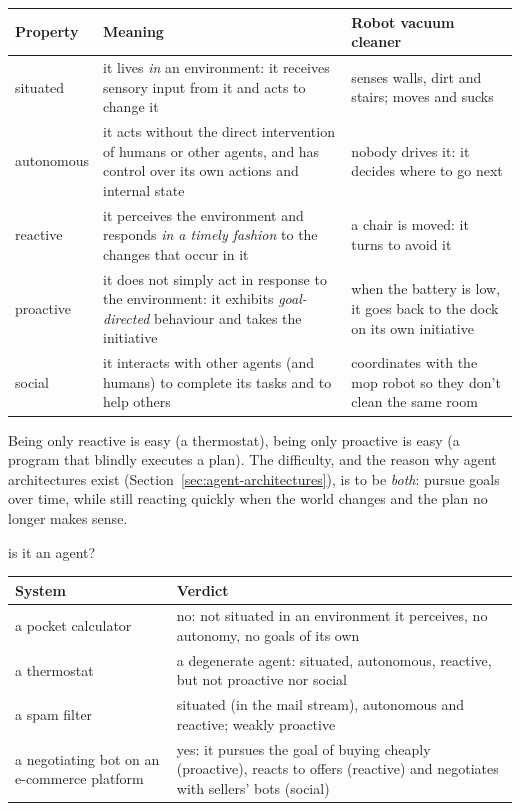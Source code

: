 \begin{center}
\small
\renewcommand{\arraystretch}{1.2}
\begin{tabularx}{\linewidth}{@{}l >{\raggedright\arraybackslash}X >{\raggedright\arraybackslash}X@{}}
\toprule
\textbf{Property} & \textbf{Meaning} & \textbf{Robot vacuum cleaner} \\
\midrule
situated & it lives \emph{in} an environment: it receives sensory input from it and
  acts to change it & senses walls, dirt and stairs; moves and sucks \\
autonomous & it acts without the direct intervention of humans or other agents, and has
  control over its own actions and internal state & nobody drives it: it decides where to
  go next \\
reactive & it perceives the environment and responds \emph{in a timely fashion} to the
  changes that occur in it & a chair is moved: it turns to avoid it \\
proactive & it does not simply act in response to the environment: it exhibits
  \emph{goal-directed} behaviour and takes the initiative & when the battery is low, it
  goes back to the dock on its own initiative \\
social & it interacts with other agents (and humans) to complete its tasks and to help
  others & coordinates with the mop robot so they don't clean the same room \\
\bottomrule
\end{tabularx}
\end{center}

\begin{nbintuition}
Being only reactive is easy (a thermostat), being only proactive is easy (a program that
blindly executes a plan). The difficulty, and the reason why agent architectures exist
(Section~\ref{sec:agent-architectures}), is to be \emph{both}: pursue goals over time, while
still reacting quickly when the world changes and the plan no longer makes sense.
\end{nbintuition}

\begin{nbexample}{is it an agent?}
\notinslides
\small
\begin{tabularx}{\linewidth}{@{}l >{\raggedright\arraybackslash}X@{}}
\toprule
\textbf{System} & \textbf{Verdict} \\
\midrule
a pocket calculator & no: not situated in an environment it perceives, no autonomy, no goals of its own \\
a thermostat & a degenerate agent: situated, autonomous, reactive, but not proactive nor social \\
a spam filter & situated (in the mail stream), autonomous and reactive; weakly proactive \\
a negotiating bot on an e-commerce platform & yes: it pursues the goal of buying cheaply (proactive), reacts to offers (reactive) and negotiates with sellers' bots (social) \\
\bottomrule
\end{tabularx}
\end{nbexample}

